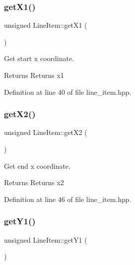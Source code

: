 \subsubsection{\texorpdfstring{get\+X1()}{getX1()}}
{\footnotesize\ttfamily unsigned Line\+Item\+::get\+X1 (\begin{DoxyParamCaption}{ }\end{DoxyParamCaption})\hspace{0.3cm}{\ttfamily [inline]}}



Get start x coordinate. 

\begin{DoxyReturn}{Returns}
Returns x1 
\end{DoxyReturn}


Definition at line 40 of file line\+\_\+item.\+hpp.

\mbox{\label{classLineItem_addce0ef5af72c233e2c7bf019c7a693d}} 
\subsubsection{\texorpdfstring{get\+X2()}{getX2()}}
{\footnotesize\ttfamily unsigned Line\+Item\+::get\+X2 (\begin{DoxyParamCaption}{ }\end{DoxyParamCaption})\hspace{0.3cm}{\ttfamily [inline]}}



Get end x coordinate. 

\begin{DoxyReturn}{Returns}
Returns x2 
\end{DoxyReturn}


Definition at line 46 of file line\+\_\+item.\+hpp.

\mbox{\label{classLineItem_abbdf5be2637561802ea22385c7c11df5}} 
\subsubsection{\texorpdfstring{get\+Y1()}{getY1()}}
{\footnotesize\ttfamily unsigned Line\+Item\+::get\+Y1 (\begin{DoxyParamCaption}{ }\end{DoxyParamCaption})\hspace{0.3cm}{\ttfamily [inline]}}



